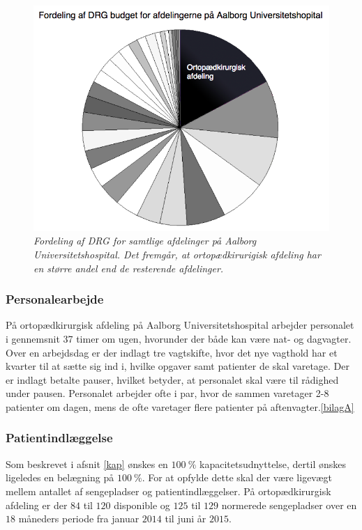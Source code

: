 \begin{figure}[H]
	\centering
	\includegraphics[scale=0.45]{figures/Ortopaeddiagram.png}
	\caption{\textit{Fordeling af DRG for samtlige afdelinger på Aalborg Universitetshospital. Det fremgår, at ortopædkirurigisk afdeling har en større andel end de resterende afdelinger.}\cite{Rasmussen2016}}
	\label{DRG_budget}
\end{figure}


\subsubsection{Personalearbejde} 
På ortopædkirurgisk afdeling på Aalborg Universitetshospital arbejder personalet i gennemsnit 37 timer om ugen\cite{Danske2015}, hvorunder der både kan være nat- og dagvagter. Over en arbejdsdag er der indlagt tre vagtskifte, hvor det nye vagthold har et kvarter til at sætte sig ind i, hvilke opgaver samt patienter de skal varetage. Der er indlagt betalte pauser, hvilket betyder, at personalet skal være til rådighed under pausen. Personalet arbejder ofte i par, hvor de sammen varetager 2-8 patienter om dagen, mens de ofte varetager flere patienter på aftenvagter.\ref{bilagA} 


\subsubsection{Patientindlæggelse} 
Som beskrevet i afsnit \ref{kap} ønskes en $100~\%$ kapacitetsudnyttelse, dertil ønskes ligeledes en belægning på $100~\%$. 
For at opfylde dette skal der være ligevægt mellem antallet af sengepladser og patientindlæggelser. På ortopædkirurgisk afdeling er der $84$ til $120$ disponible og $125$ til $129$ normerede sengepladser over en $18$ måneders periode fra januar $2014$ til juni år $2015$. 


